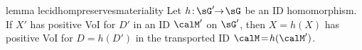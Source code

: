 








\begin{restatable}{lemma} {lecidhompreservesmateriality} \label{th:CID-homomorphism-preserves-Materiality}
    Let $h\colon\!\sG'\!\!\to\! \sG$ be an ID homomorphism.
    If $X'$ has positive VoI for $D'$ in an ID $\calM'$ on $\sG'$, then $X\!=\!h(X)$ has positive VoI for $D\!=\!h(D')$ in the transported ID $\calM\!=\!h(\calM')$.~
\end{restatable}





